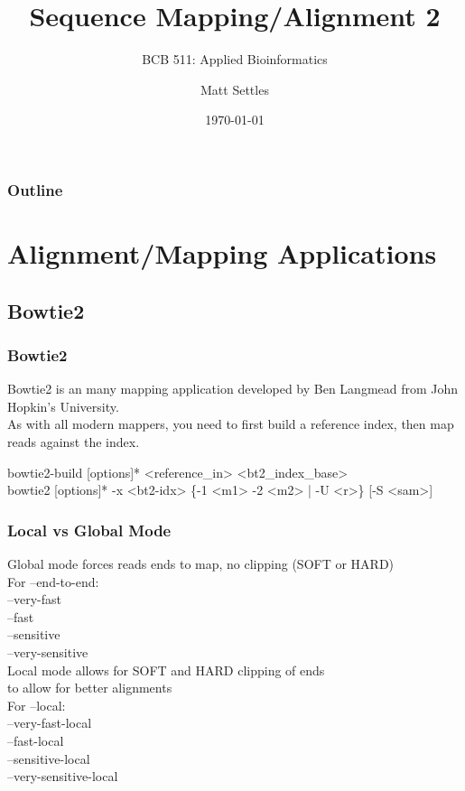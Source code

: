 \documentclass[pdf]{beamer}
\begin{document}
\title[Sequence Mapping]{Sequence Mapping/Alignment 2}
\subtitle{BCB 511: Applied Bioinformatics\\}
\author[Matt Settles]{Matt Settles}
\date{\today}


\begin{frame}[plain]
  \titlepage
\end{frame}


\begin{frame}[plain] 
  \frametitle{Outline}
  \tableofcontents
\end{frame}

\section{Alignment/Mapping Applications}

\subsection{Bowtie2}

\begin{frame}
  \frametitle{Bowtie2}
Bowtie2 is an many mapping application developed by Ben Langmead from John Hopkin's University.\\
As with all modern mappers, you need to first build a reference index, then map reads against the index.\\
\begin{footnotesize}
 \begin{verbatim*}
bowtie2-build [options]* <reference\_in> <bt2\_index\_base>\\
bowtie2 [options]* -x <bt2-idx> \{-1 <m1> -2 <m2> | -U <r>\} [-S <sam>]
\end{verbatim*}
\end{footnotesize}
\end{frame}

\begin{frame}
  \frametitle{Local vs Global Mode}
\begin{footnotesize}
\begin{verbatim*}
Global mode forces reads ends to map, no clipping (SOFT or HARD)\\
  For --end-to-end:\\
   --very-fast\\
   --fast\\ 
   --sensitive\\
   --very-sensitive\\
Local mode allows for SOFT and HARD clipping of ends \\ to allow for better alignments\\
  For --local:\\
   --very-fast-local \\
   --fast-local\\
   --sensitive-local\\
   --very-sensitive-local\\
\end{verbatim*}
\end{footnotesize}
\end{frame}
 
\end{document}
